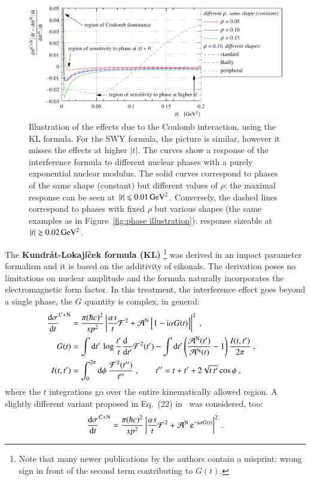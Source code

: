 \begin{figure}
\begin{center}
\includegraphics{fig/cni_effect_illustration.pdf}
\caption{%
Illustration of the effects due to the Coulomb interaction, using the KL formula. For the SWY formula, the picture is similar, however it misses the effects at higher $|t|$. The curves show a response of the interference formula to different nuclear phases with a purely exponential nuclear modulus. The solid curves correspond to phases of the same shape (constant) but different values of $\rho$: the maximal response can be seen at $|t| \lesssim 0.01\,{\rm GeV^2}$. Conversely, the dashed lines correspond to phases with fixed $\rho$ but various shapes (the same examples as in Figure~\ref{fig:phase illustration}): response sizeable at $|t| \gtrsim 0.02\,{\rm GeV^2}$.
}
\label{fig:cni effect}
\end{center}
\end{figure}

The {\bf Kundr\' at-Lokaj\' i\v cek formula (KL)} \cite{kl94}\footnote{%
Note that many newer publications by the authors contain a misprint: wrong sign in front of the second term contributing to $G(t)$.
} was derived in an impact parameter formalism and it is based on the additivity of eikonals. The derivation poses no limitations on nuclear amplitude and the formula naturally incorporates the electromagnetic form factor. In this treatment, the interference effect goes beyond a single phase, the $G$ quantity is complex, in general:
\begin{equation}
\label{eq:int kl}
	\begin{aligned}
		{\d\sigma\over \d t}^{\rm C+N} &= {\pi (\hbar c)^2 \over s p^2} \left | {\alpha s\over t} {\cal F}^2
			+ {\cal A}^{\rm N}\, \Big[1 - \I\alpha G(t)\Big] \right |^2\ ,\cr
		G(t) &= 
			\int \d t'\, \log {t'\over t} {\d\phantom{t'}\over \d t'} {\cal F}^2(t')
			- \int \d t' \left( {{\cal A}^{\rm N}(t') \over {\cal A}^{\rm N}(t)} - 1 \right) { I(t, t')\over 2\pi }
			\ ,\cr
		I(t, t') &= \int_0^{2\pi} \d\phi\ {{\cal F}^2(t'')\over t''}\ ,\qquad t'' = t + t' + 2\sqrt{t\, t'} \cos\phi\ ,\cr
	\end{aligned}
\end{equation}
where the $t$ integrations go over the entire kinematically allowed region. A slightly different variant proposed in Eq.~(22) in~\cite{kl05} was considered, too:
\begin{equation}
\label{eq:int kl exp}
	{\d\sigma\over \d t}^{\rm C+N} = {\pi (\hbar c)^2 \over s p^2} \left | {\alpha s\over t} {\cal F}^2
		+ {\cal A}^{\rm N}\, \e^{- \I\alpha G(t)} \right |^2 \ .
\end{equation}

